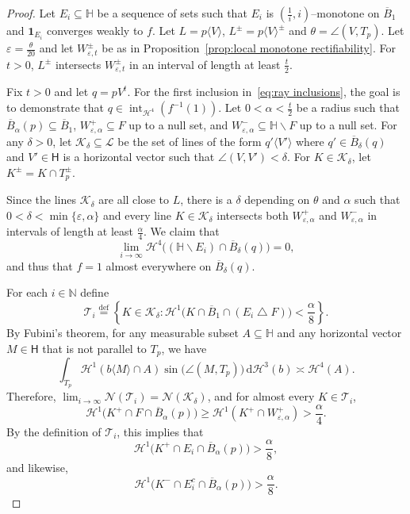 \documentclass[11pt,reqno]{amsart}
\renewcommand{\H}{\mathbb{H}}
\newcommand{\N}{\mathbb{N}}
\newcommand{\cH}{\mathcal{H}}
\newcommand{\cK}{\mathcal{K}}
\newcommand{\cL}{\mathcal{L}}
\newcommand{\cN}{\mathcal{N}}
\newcommand{\cT}{\mathcal{T}}
\renewcommand{\epsilon}{\varepsilon}
\renewcommand{\approx}{\asymp}
\newcommand{\ud}[0]{\,\mathrm{d}}
\newcommand{\0}{\mathbf{0}}
\renewcommand{\1}{\mathbf 1}
\newcommand{\one}{\mathbf{1}}
\newcommand{\symdiff}{\mathbin{\triangle}}
\renewcommand{\mid}{:}
\renewcommand{\subset}{\subseteq}
\newcommand{\eqdef}{\stackrel{\mathrm{def}}{=}}
\renewcommand{\ge}{\geqslant}
\renewcommand{\setminus}{\smallsetminus}
\theoremstyle{remark}
\DeclareMathOperator{\inter}{int}
\begin{document}
\begin{proof}
  Let $E_i\subset \H$ be a sequence of sets such that $E_i$ is $(\frac{1}{i},i)$--monotone on $\overline{B}_1$ and $\one_{E_i}$ converges weakly to $f$.  Let $L=p\langle V\rangle$, $L^\pm=p\langle V\rangle^\pm$ and $\theta=\angle(V, T_p)$.  Let $\epsilon=\frac{\theta}{20}$ and let $W^\pm_{\epsilon,t}$ be as in Proposition~\ref{prop:local monotone rectifiability}.  For  $t>0$, $L^\pm$ intersects $W^\pm_{\epsilon,t}$ in an interval of length at least $\frac{t}{2}$.

  Fix $t>0$ and let $q=pV^t$.  For the first inclusion in~\eqref{eq:ray inclusions}, the goal is to demonstrate that $q\in \inter_{\cH^4}( f^{-1}(1))$.  Let $0<\alpha<\frac{t}{2}$ be a radius such that $\overline{B}_\alpha(p)\subset \overline{B}_1$, $W^+_{\epsilon,\alpha}\subset F$ up to a null set, and $W^-_{\epsilon,\alpha}\subset \H\setminus F$ up to a null set.  For any $\delta>0$, let $\cK_\delta\subset \cL$ be the set of lines of the form $q'\langle V'\rangle$ where $q'\in \overline{B}_{\delta}(q)$ and $V'\in \mathsf{H}$ is a horizontal vector such that $\angle(V,V')<\delta$.  For $K\in \cK_\delta$, let $K^\pm=K\cap T_p^{\pm}$.

  Since the lines $\cK_\delta$ are all close to $L$, there is a $\delta$ depending on $\theta$ and $\alpha$ such that $0<\delta<\min\{\epsilon, \alpha\}$ and every line $K\in \cK_\delta$ intersects both $W^+_{\epsilon,\alpha}$ and $W^-_{\epsilon,\alpha}$ in intervals of length at least $\frac{\alpha}{4}$.  We claim that
  $$\lim_{i\to \infty} \cH^4\big( (\H\setminus E_i)\cap \overline{B}_{\delta}(q) \big)=0,$$
  and thus that $f=1$ almost everywhere on $\overline{B}_{\delta}(q)$.

  For each $i\in \N$ define
  $$\cT_i\eqdef \left\{K\in \cK_\delta \mid \cH^1\big(K \cap \overline{B}_1\cap (E_i\symdiff F)\big) < \frac{\alpha}{8}\right\}.$$
  By Fubini's theorem, for any measurable subset $A\subset \H$ and any horizontal vector $M\in \mathsf{H}$ that is not parallel to $T_p$, we have
  \begin{equation}\label{eq:fubini sets heis}
    \int_{T_p} \cH^1(b\langle M\rangle \cap A) \sin \big(\angle(M,T_p)\big) \ud \cH^3(b) \approx \cH^{4}(A).
  \end{equation}
  Therefore, $\lim_{i\to \infty}\cN(\cT_i)=\cN(\cK_\delta)$, and for almost every $K\in \cT_i$,
  $$\cH^1\big(K^+\cap F \cap \overline{B}_\alpha(p)\big) \ge \cH^1(K^+ \cap W^+_{\epsilon,\alpha}) > \frac{\alpha}{4}.$$
 By the definition of $\cT_i$, this implies that
  \begin{equation}\label{eq:k intersect alpha 8}
    \cH^1\big(K^+\cap E_i \cap \overline{B}_\alpha(p)\big) > \frac{\alpha}{8},
  \end{equation}
  and likewise,
  \begin{equation}\label{eq:k intersect alpha 8 comp}
    \cH^1\big(K^-\cap E_i^c \cap \overline{B}_\alpha(p)\big)> \frac{\alpha}{8}.
  \end{equation}


\end{proof}
\end{document}

